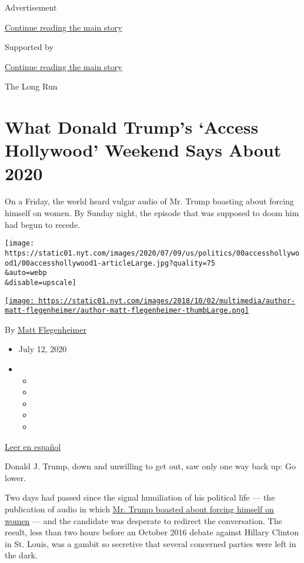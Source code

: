 Advertisement

\protect\hyperlink{after-top}{Continue reading the main story}

Supported by

\protect\hyperlink{after-sponsor}{Continue reading the main story}

The Long Run

\hypertarget{what-donald-trumps-access-hollywood-weekend-says-about-2020}{%
\section{What Donald Trump's `Access Hollywood' Weekend Says About
2020}\label{what-donald-trumps-access-hollywood-weekend-says-about-2020}}

On a Friday, the world heard vulgar audio of Mr. Trump boasting about
forcing himself on women. By Sunday night, the episode that was supposed
to doom him had begun to recede.

\texttt{[image: https://static01.nyt.com/images/2020/07/09/us/politics/00accesshollywood1/00accesshollywood1-articleLarge.jpg?quality=75\\\&auto=webp\\\&disable=upscale]}

\href{https://www.nytimes.com/by/matt-flegenheimer}{\texttt{[image: https://static01.nyt.com/images/2018/10/02/multimedia/author-matt-flegenheimer/author-matt-flegenheimer-thumbLarge.png]}}

By \href{https://www.nytimes.com/by/matt-flegenheimer}{Matt
Flegenheimer}

\begin{itemize}
\item
  July 12, 2020
\item
  \begin{itemize}
  \item
  \item
  \item
  \item
  \item
  \end{itemize}
\end{itemize}

\href{https://www.nytimes.com/es/2020/07/14/espanol/estados-unidos/Donald-trump-eleciones-video-hollywood.html}{Leer
en español}

Donald J. Trump, down and unwilling to get out, saw only one way back
up: Go lower.

Two days had passed since the signal humiliation of his political life
--- the publication of audio in which
\href{https://www.nytimes.com/2016/10/08/us/donald-trump-tape-transcript.html}{Mr.
Trump boasted about forcing himself on women} --- and the candidate was
desperate to redirect the conversation. The result, less than two hours
before an October 2016 debate against Hillary Clinton in St. Louis, was
a gambit so secretive that several concerned parties were left in the
dark.

